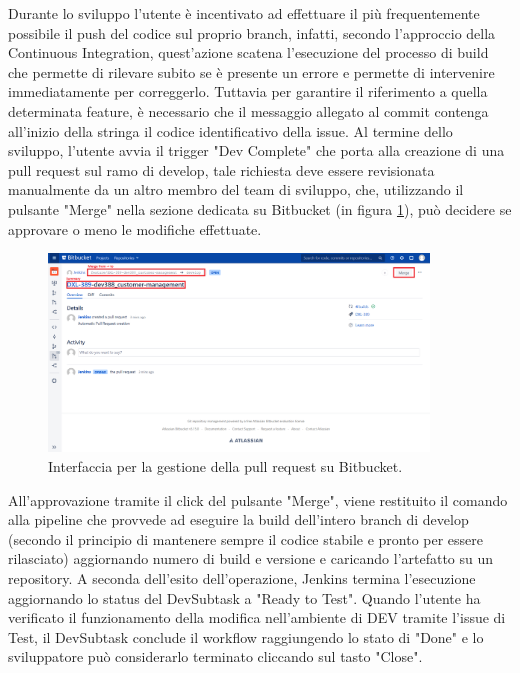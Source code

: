 \documentclass[a4paper, 12pt]{report}
\numberwithin{equation}{section}
\begin{document}
Durante lo sviluppo l'utente è incentivato ad effettuare il più frequentemente possibile il push del codice sul proprio branch, infatti, secondo l'approccio della Continuous Integration, quest'azione scatena l'esecuzione del processo di build che permette di rilevare subito se è presente un errore e permette di intervenire immediatamente per correggerlo. Tuttavia per garantire il riferimento a quella determinata feature, è necessario che il messaggio allegato al commit contenga all'inizio della stringa il codice identificativo della issue. Al termine dello sviluppo, l'utente avvia il trigger "Dev Complete" che porta alla creazione di una pull request sul ramo di develop, tale richiesta deve essere revisionata manualmente da un altro membro del team di sviluppo, che, utilizzando il pulsante "Merge" nella sezione dedicata su Bitbucket (in figura \ref{fig:bitbucket-merge}), può decidere se approvare o meno le modifiche effettuate.
\begin{figure}
    \centering
    \includegraphics[width=0.9\textwidth]{imgs/bitbucket.png}
    \caption{Interfaccia per la gestione della pull request su Bitbucket.}
    \label{fig:bitbucket-merge}
\end{figure}
All'approvazione tramite il click del pulsante "Merge", viene restituito il comando alla pipeline che provvede ad eseguire la build dell'intero branch di develop (secondo il principio di mantenere sempre il codice stabile e pronto per essere rilasciato) aggiornando numero di build e versione e caricando l'artefatto su un repository. A seconda dell'esito dell'operazione, Jenkins termina l'esecuzione aggiornando lo status del DevSubtask a "Ready to Test". Quando l'utente ha verificato il funzionamento della modifica nell'ambiente di DEV tramite l'issue di Test, il DevSubtask conclude il workflow raggiungendo lo stato di "Done" e lo sviluppatore può considerarlo terminato cliccando sul tasto "Close".
\end{document}
